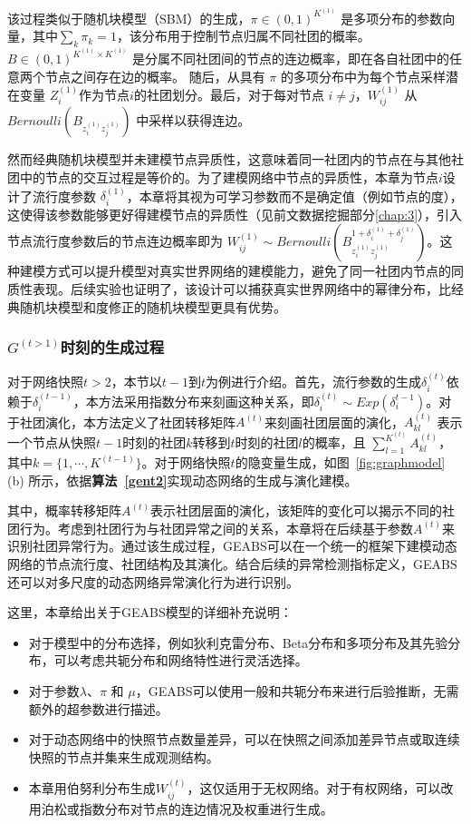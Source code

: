 该过程类似于随机块模型（SBM）的生成，$\pi \in (0,1)^{K^{(1)}}$ 是多项分布的参数向量，其中$\sum_k \pi_k =1$，该分布用于控制节点归属不同社团的概率。$B \in (0,1)^{K^{(1)} \times K^{(1)}}$ 是分属不同社团间的节点的连边概率，即在各自社团中的任意两个节点之间存在边的概率。
随后，从具有 $\pi$ 的多项分布中为每个节点采样潜在变量 $Z_i^{(1)}$作为节点$i$的社团划分。最后，对于每对节点 $i \ne j$，$W^{(1)}_{ij}$ 从 $Bernoulli(B_{z_i^{(1)} z_j^{(1)}})$ 中采样以获得连边。

然而经典随机块模型并未建模节点异质性，这意味着同一社团内的节点在与其他社团中的节点的交互过程是等价的。为了建模网络中节点的异质性，本章为节点$i$设计了流行度参数 $\delta^{(1)}_i$，本章将其视为可学习参数而不是确定值（例如节点的度），这使得该参数能够更好得建模节点的异质性（见前文数据挖掘部分\ref{chap:3}），引入节点流行度参数后的节点连边概率即为 $W^{(1)}_{ij} \sim Bernoulli\left(B_{z_i^{(1)} z_j^{(1)}}^{1+\delta_i^{(1)} + \delta_j^{(1)}}\right)$。这种建模方式可以提升模型对真实世界网络的建模能力，避免了同一社团内节点的同质性表现。后续实验也证明了，该设计可以捕获真实世界网络中的幂律分布，比经典随机块模型和度修正的随机块模型更具有优势。

\subsubsection{$G^{(t>1)}$时刻的生成过程}

对于网络快照$t > 2$，本节以$t-1$到$t$为例进行介绍。首先，流行参数的生成$\delta_i^{(t)}$依赖于$\delta_i^{(t-1)}$，本方法采用指数分布来刻画这种关系，即$\delta_i^{(t)} \sim Exp(\delta_i^{t-1})$。对于社团演化，本方法定义了社团转移矩阵$A^{(t)}$来刻画社团层面的演化，$A^{(t)}_{kl}$ 表示一个节点从快照$t-1$时刻的社团$k$转移到$t$时刻的社团$l$的概率，且 $\sum_{l=1}^{K^{(t)}}A^{(t)}_{kl}$，其中$k =\{1, \cdots, K^{(t-1)}\}$。对于网络快照$t$的隐变量生成，如图~\ref{fig:graphmodel} (b) 所示，依据\textbf{算法~\ref{gent2}}实现动态网络的生成与演化建模。

其中，概率转移矩阵$A^{(t)}$表示社团层面的演化，该矩阵的变化可以揭示不同的社团行为。考虑到社团行为与社团异常之间的关系，本章将在后续基于参数$A^{(t)}$来识别社团异常行为。通过该生成过程，GEABS可以在一个统一的框架下建模动态网络的节点流行度、社团结构及其演化。结合后续的异常检测指标定义，GEABS还可以对多尺度的动态网络异常演化行为进行识别。

这里，本章给出关于GEABS模型的详细补充说明：
\begin{itemize}
    \item 对于模型中的分布选择，例如狄利克雷分布、Beta分布和多项分布及其先验分布，可以考虑共轭分布和网络特性进行灵活选择。
    \item  对于参数$\lambda$、$\pi$ 和 $\mu$，GEABS可以使用一般和共轭分布来进行后验推断，无需额外的超参数进行描述。
    \item  对于动态网络中的快照节点数量差异，可以在快照之间添加差异节点或取连续快照的节点并集来生成观测结构。
    \item  本章用伯努利分布生成$W^{(t)}_{ij}$，这仅适用于无权网络。对于有权网络，可以改用泊松或指数分布对节点的连边情况及权重进行生成。
\end{itemize}

